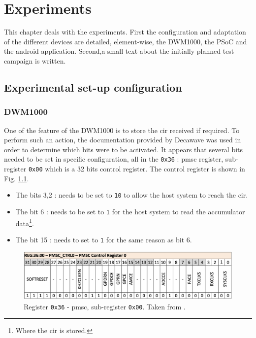 \chapter{Experiments}

This chapter deals with the experiments. First the configuration and adaptation of the different devices are detailed, element-wise, the DWM1000, the PSoC and the android application. Second,a small text about the initially planned test campaign is written.

\section{Experimental set-up configuration}

\subsection{DWM1000}

One of the feature of the DWM1000 is to store the \gls{cir} received if required. To perform such an action, the documentation provided by Decawave \cite{usermanual} was used in order to determine which bits were to be activated. It appears that several bits needed to be set in specific configuration, all in the \texttt{0x36} : \gls{pmsc} register, sub-register \texttt{0x00} which is a 32 bits control register. The control register is shown in Fig. \ref{fig:control_reg}.
\vspace{2mm}

\begin{itemize}
\item The bits 3,2 :    needs to be set to \texttt{10} to allow the host system to reach the \gls{cir}.
\item The bit 6 :  needs to be set to \texttt{1} for the host system to read the accumulator data\footnote{Where the \gls{cir} is stored.}.
\item The bit 15 :  needs to set to \texttt{1} for the same reason as bit 6.
\end{itemize}

\begin{figure}[H]
\centering
\includegraphics[width=.9\linewidth]{Images/control_ref.png}
\caption{Register \texttt{0x36} - \gls{pmsc}, sub-register \texttt{0x00}. Taken from \cite{usermanual}. \label{fig:control_reg}}
\end{figure}

